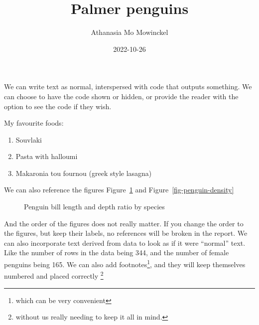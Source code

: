 \documentclass[
]{report}
\title{Palmer penguins}
\author{Athanasia Mo Mowinckel}
\date{2022-10-26}
\providecommand{\tightlist}{%
  \setlength{\itemsep}{0pt}\setlength{\parskip}{0pt}}\usepackage{longtable,booktabs,array}
\renewcommand*\contentsname{Table of contents}
\newcommand\contentsname{Table of contents}
\begin{document}
\maketitle

\renewcommand*\contentsname{Contents}
{
\hypersetup{linkcolor=}
\setcounter{tocdepth}{1}
\tableofcontents
}
We can write text as normal, interspersed with code that outputs
something. We can choose to have the code shown or hidden, or provide
the reader with the option to see the code if they wish.

My favourite foods:

\begin{enumerate}
\def\labelenumi{\arabic{enumi}.}
\tightlist
\item
  Souvlaki
\item
  Pasta with halloumi
\item
  Makaronia tou fournou (greek style lasagna)
\end{enumerate}

We can also reference the figures Figure~\ref{fig-penguin-smooth} and
Figure~\ref{fig-penguin-density}

\begin{figure}[h]


\caption{\label{fig-penguin-smooth}Penguin bill length and depth ratio
by species}

\end{figure}%

And the order of the figures does not really matter. If you change the
order to the figures, but keep their labels, no references will be
broken in the report. We can also incorporate text derived from data to
look as if it were ``normal'' text. Like the number of rows in the data
being 344, and the number of female penguins being 165. We can also add
footnotes\footnote{which can be very convenient}, and they will keep
themselves numbered and placed correctly \footnote{without us really
  needing to keep it all in mind.}
\end{document}
